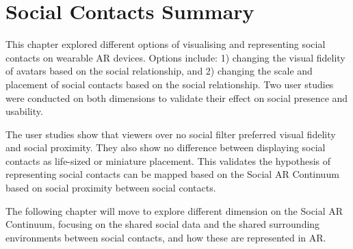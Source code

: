 \pagebreak
\section{Social Contacts Summary}

This chapter explored different options of visualising and representing social contacts on wearable AR devices. Options include: 1) changing the visual fidelity of avatars based on the social relationship, and 2) changing the scale and placement of social contacts based on the social relationship. Two user studies were conducted on both dimensions to validate their effect on social presence and usability. 

The user studies show that viewers over no social filter preferred visual fidelity and social proximity. They also show no difference between displaying social contacts as life-sized or miniature placement. This validates the hypothesis of representing social contacts can be mapped based on the Social AR Continuum based on social proximity between social contacts. 

The following chapter will move to explore different dimension on the Social AR Continuum, focusing on the shared social data and the shared surrounding environments between social contacts, and how these are represented in AR. 


